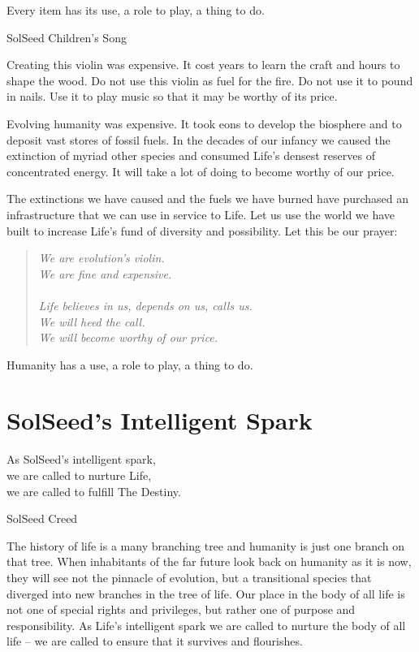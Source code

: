 \documentclass[ebook,12pt,openany,twoside]{memoir}
\newcommand{\tab}{\hspace*{2em}}
\newcommand{\imagefacingchapter}[1]{
  \cleartoverso
  \clearpage \null
  \thispagestyle{cleared}
  \AddToShipoutPictureBG*{%
    \AtStockLowerLeft{%
      \texttt{[image: \#1]}
    }
  }
  \clearpage
}
\begin{document}
\setlength\epigraphwidth{3.4in}
\epigraph{
  Every item has its use, a role to play, a thing to do.
}{SolSeed Children's Song}

\noindent Creating this violin was expensive. It cost years to learn the craft and hours
to shape the wood. Do not use this violin as fuel for the fire. Do not use it
to pound in nails. Use it to play music so that it may be worthy of its price.

Evolving humanity was expensive. It took eons to develop the biosphere and to
deposit vast stores of fossil fuels. In the decades of our infancy we caused
the extinction of myriad other species and consumed Life's densest reserves of
concentrated energy. It will take a lot of doing to become worthy of our price.

The extinctions we have caused and the fuels we have burned have purchased an
infrastructure that we can use in service to Life. Let us use the world we have
built to increase Life's fund of diversity and possibility. Let this be our
prayer:

\begin{quote}
	\em
We are evolution's violin.\\
\tab We are fine and expensive.\\
\\
Life believes in us, depends on us, calls us.\\
\tab We will heed the call.\\
\tab We will become worthy of our price.
\end{quote}

Humanity has a use, a role to play, a thing to do.

\imagefacingchapter{images/TakeRootAmongstTheStars-comp}
\chapter{SolSeed's Intelligent Spark}

\setlength\epigraphwidth{2.7in}
\epigraph{
  As SolSeed's intelligent spark,\\
  \tab we are called to nurture Life,\\
  \tab we are called to fulfill The Destiny.
}{SolSeed Creed}

\noindent The history of life is a many branching tree and humanity is just one
branch on that tree. When inhabitants of the far future look back on humanity
as it is now, they will see not the pinnacle of evolution, but a transitional
species that diverged into new branches in the tree of life. Our place in the
body of all life is not one of special rights and privileges, but rather one of
purpose and responsibility. As Life's intelligent spark we are called to
nurture the body of all life -- we are called to ensure that it survives and
flourishes.
\end{document}
